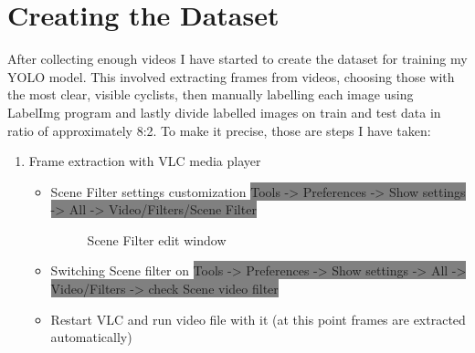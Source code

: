 \section{Creating the Dataset}
\label{sec: dataset}
After collecting enough videos I have started to create the dataset for training my YOLO model. This involved extracting frames from videos, choosing those with the most clear, visible cyclists, then manually labelling each image using LabelImg program and lastly divide labelled images on train and test data in ratio of approximately 8:2. To make it precise, those are steps I have taken:
\begin{enumerate}
    \item Frame extraction with VLC media player
    \begin{itemize}
        \item Scene Filter settings customization
        \newline \colorbox{Gray}{Tools -> Preferences -> Show settings -> All -> Video/Filters/Scene Filter}
        \begin{figure}[H]
            \centering
            \caption{Scene Filter edit window}
            \label{fig:vlc1}
        \end{figure}
        \item Switching Scene filter on
        \newline \colorbox{Gray}{Tools -> Preferences -> Show settings -> All -> Video/Filters -> check Scene video filter}
        \item Restart VLC and run video file with it (at this point frames are extracted automatically) 

\end{itemize}
\end{enumerate}
